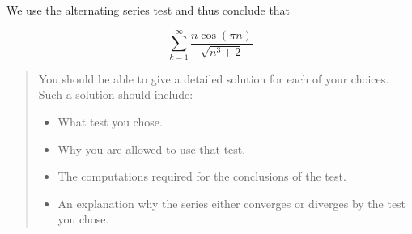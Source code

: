 \documentclass{ximera}
\begin{document}
\begin{exercise}
\begin{hint}
\begin{question}
We use the alternating series test and thus conclude that

\[
\sum_{k=1}^{\infty} \frac{n \cos(\pi n)}{\sqrt{n^3+2}}
\]

\begin{multipleChoice}
\end{multipleChoice}

\end{question}
\end{hint}







\begin{quote}
You should be able to give a detailed solution for each of your choices.  Such a solution should include:

\begin{itemize}
\item What test you chose.
\item Why you are allowed to use that test.
\item The computations required for the conclusions of the test.
\item An explanation why the series either converges or diverges by the test you chose.
\end{itemize}

\end{quote}


\end{exercise}
\end{document}
